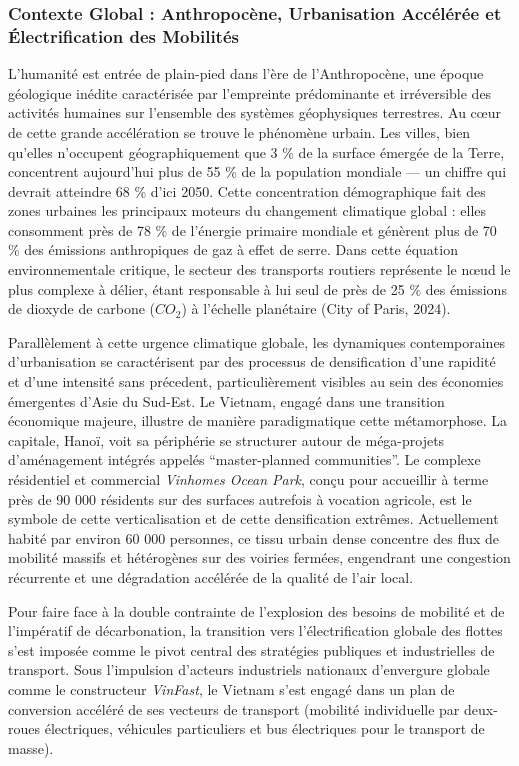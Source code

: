 \documentclass[10pt, a4paper]{article}
\begin{document}
\subsubsection{Contexte Global : Anthropocène, Urbanisation Accélérée et
Électrification des
Mobilités}\label{contexte-global-anthropocuxe8ne-urbanisation-accuxe9luxe9ruxe9e-et-uxe9lectrification-des-mobilituxe9s}

L'humanité est entrée de plain-pied dans l'ère de l'Anthropocène, une
époque géologique inédite caractérisée par l'empreinte prédominante et
irréversible des activités humaines sur l'ensemble des systèmes
géophysiques terrestres. Au cœur de cette grande accélération se trouve
le phénomène urbain. Les villes, bien qu'elles n'occupent
géographiquement que 3 \% de la surface émergée de la Terre, concentrent
aujourd'hui plus de 55 \% de la population mondiale --- un chiffre qui
devrait atteindre 68 \% d'ici 2050. Cette concentration démographique
fait des zones urbaines les principaux moteurs du changement climatique
global : elles consomment près de 78 \% de l'énergie primaire mondiale
et génèrent plus de 70 \% des émissions anthropiques de gaz à effet de
serre. Dans cette équation environnementale critique, le secteur des
transports routiers représente le nœud le plus complexe à délier, étant
responsable à lui seul de près de 25 \% des émissions de dioxyde de
carbone (\(CO_2\)) à l'échelle planétaire (City of Paris, 2024).

Parallèlement à cette urgence climatique globale, les dynamiques
contemporaines d'urbanisation se caractérisent par des processus de
densification d'une rapidité et d'une intensité sans précedent,
particulièrement visibles au sein des économies émergentes d'Asie du
Sud-Est. Le Vietnam, engagé dans une transition économique majeure,
illustre de manière paradigmatique cette métamorphose. La capitale,
Hanoï, voit sa périphérie se structurer autour de méga-projets
d'aménagement intégrés appelés ``master-planned communities''. Le
complexe résidentiel et commercial \emph{Vinhomes Ocean Park}, conçu
pour accueillir à terme près de 90 000 résidents sur des surfaces
autrefois à vocation agricole, est le symbole de cette verticalisation
et de cette densification extrêmes. Actuellement habité par environ 60
000 personnes, ce tissu urbain dense concentre des flux de mobilité
massifs et hétérogènes sur des voiries fermées, engendrant une
congestion récurrente et une dégradation accélérée de la qualité de
l'air local.

Pour faire face à la double contrainte de l'explosion des besoins de
mobilité et de l'impératif de décarbonation, la transition vers
l'électrification globale des flottes s'est imposée comme le pivot
central des stratégies publiques et industrielles de transport. Sous
l'impulsion d'acteurs industriels nationaux d'envergure globale comme le
constructeur \emph{VinFast}, le Vietnam s'est engagé dans un plan de
conversion accéléré de ses vecteurs de transport (mobilité individuelle
par deux-roues électriques, véhicules particuliers et bus électriques
pour le transport de masse).
\end{document}
